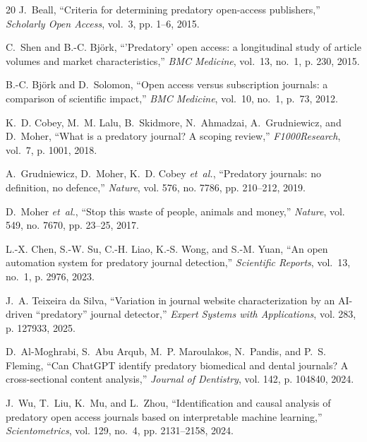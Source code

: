 \documentclass[journal]{IEEEtran}
\begin{document}
\begin{thebibliography}{20}
J.~Beall, ``Criteria for determining predatory open-access publishers,'' \emph{Scholarly Open Access}, vol.~3, pp. 1--6, 2015.

C.~Shen and B.-C. Bj{\"o}rk, ``'Predatory' open access: a longitudinal study of article volumes and market characteristics,'' \emph{BMC Medicine}, vol.~13, no.~1, p. 230, 2015.

B.-C. Bj{\"o}rk and D.~Solomon, ``Open access versus subscription journals: a comparison of scientific impact,'' \emph{BMC Medicine}, vol.~10, no.~1, p.~73, 2012.

K.~D. Cobey, M.~M. Lalu, B.~Skidmore, N.~Ahmadzai, A.~Grudniewicz, and D.~Moher, ``What is a predatory journal? A scoping review,'' \emph{F1000Research}, vol.~7, p. 1001, 2018.

A.~Grudniewicz, D.~Moher, K.~D. Cobey \emph{et~al.}, ``Predatory journals: no definition, no defence,'' \emph{Nature}, vol. 576, no. 7786, pp. 210--212, 2019.

D.~Moher \emph{et~al.}, ``Stop this waste of people, animals and money,'' \emph{Nature}, vol. 549, no. 7670, pp. 23--25, 2017.

L.-X. Chen, S.-W. Su, C.-H. Liao, K.-S. Wong, and S.-M. Yuan, ``An open automation system for predatory journal detection,'' \emph{Scientific Reports}, vol.~13, no.~1, p. 2976, 2023.

J.~A. Teixeira da Silva, ``Variation in journal website characterization by an AI-driven ``predatory'' journal detector,'' \emph{Expert Systems with Applications}, vol. 283, p. 127933, 2025.

D.~Al-Moghrabi, S.~Abu Arqub, M.~P. Maroulakos, N.~Pandis, and P.~S. Fleming, ``Can ChatGPT identify predatory biomedical and dental journals? A cross-sectional content analysis,'' \emph{Journal of Dentistry}, vol. 142, p. 104840, 2024.

J.~Wu, T.~Liu, K.~Mu, and L.~Zhou, ``Identification and causal analysis of predatory open access journals based on interpretable machine learning,'' \emph{Scientometrics}, vol. 129, no.~4, pp. 2131--2158, 2024.


\end{thebibliography}
\end{document}
